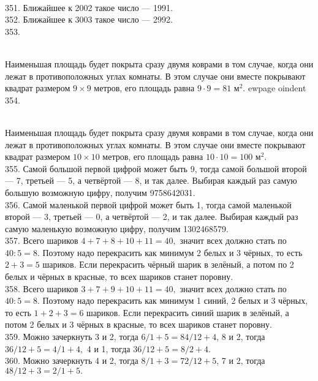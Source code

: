 \begin{figure}[ht!]
\end{figure}\\
351. Ближайшее к 2002 такое число --- 1991.\\
352. Ближайшее к 3003 такое число --- 2992.\\
353. \begin{figure}[ht!]
\end{figure}\\
Наименьшая площадь будет покрыта сразу двумя коврами в том случае, когда они лежат в противоположных углах комнаты. В этом случае они вместе покрывают квадрат размером $9\times9$ метров, его площадь равна $9\cdot9=81\text{ м}^2.$
ewpage
oindent
354. \begin{figure}[ht!]
\end{figure}\\
Наименьшая площадь будет покрыта сразу двумя коврами в том случае, когда они лежат в противоположных углах комнаты. В этом случае они вместе покрывают квадрат размером $10\times10$ метров, его площадь равна $10\cdot10=100\text{ м}^2.$\\
355. Самой большой первой цифрой может быть 9, тогда самой большой второй --- 7, третьей --- 5, а четвёртой --- 8, и так далее. Выбирая каждый раз самую большую возможную цифру, получим 9758642031.\\
356. Самой маленькой первой цифрой может быть 1, тогда самой маленькой второй --- 3, третьей --- 0, а четвёртой --- 2, и так далее. Выбирая каждый раз самую маленькую возможную цифру, получим 1302468579.\\
357. Всего шариков $4+7+8+10+11=40,$ значит всех должно стать по $40:5=8.$ Поэтому надо перекрасить как минимум 2 белых и 3 чёрных, то есть $2+3=5$ шариков. Если перекрасить чёрный шарик в зелёный, а потом по 2 белых и чёрных в красные, то всех шариков станет поровну.\\
358. Всего шариков $3+7+9+10+11=40,$ значит всех должно стать по $40:5=8.$ Поэтому надо перекрасить как минимум 1 синий, 2 белых и 3 чёрных, то есть $1+2+3=6$ шариков. Если перекрасить синий шарик в зелёный, а потом 2 белых и 3 чёрных в красные, то всех шариков станет поровну.\\
359. Можно зачеркнуть 3 и 2, тогда $6/1+5=84/12+4$, 8 и 2, тогда $36/12+5=4/1+4,$ 4 и 1, тогда $36/12+5=8/2+4.$\\
360. Можно зачеркнуть 4 и 2, тогда $8/1+3=72/12+5$, 7 и 2, тогда $48/12+3=2/1+5.$\\
